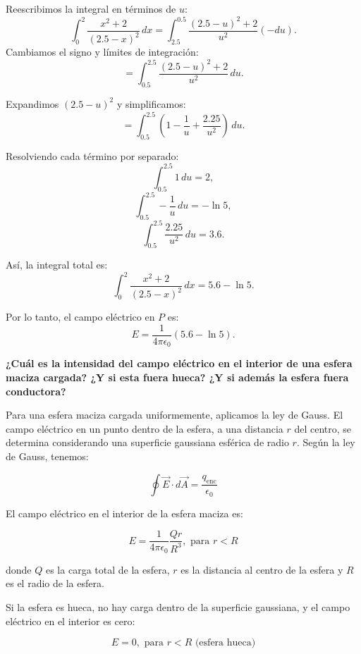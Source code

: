 \documentclass[12pt, answers]{exam} %
\begin{document}
\begin{questions}
    Reescribimos la integral en términos de \(u\):
    \[
    \int_0^2 \frac{x^2 + 2}{(2.5 - x)^2} \, dx = \int_{2.5}^{0.5} \frac{(2.5 - u)^2 + 2}{u^2} (-du).
    \]
    Cambiamos el signo y límites de integración:
    \[
    = \int_{0.5}^{2.5} \frac{(2.5 - u)^2 + 2}{u^2} \, du.
    \]
    
    Expandimos \((2.5 - u)^2\) y simplificamos:
    \[
    = \int_{0.5}^{2.5} \left( 1 - \frac{1}{u} + \frac{2.25}{u^2} \right) \, du.
    \]
    
    Resolviendo cada término por separado:
    \[
    \int_{0.5}^{2.5} 1 \, du = 2,
    \]
    \[
    \int_{0.5}^{2.5} -\frac{1}{u} \, du = -\ln 5,
    \]
    \[
    \int_{0.5}^{2.5} \frac{2.25}{u^2} \, du = 3.6.
    \]
    
    Así, la integral total es:
    \[
    \int_0^2 \frac{x^2 + 2}{(2.5 - x)^2} \, dx = 5.6 - \ln 5.
    \]
    

    
    Por lo tanto, el campo eléctrico en \(P\) es:
    \[
    E = \frac{1}{4 \pi \epsilon_0} \left( 5.6 - \ln 5 \right).
    \]

    \question \large\textbf{¿Cuál es la intensidad del campo eléctrico en el interior de una esfera maciza cargada? ¿Y si esta fuera hueca? ¿Y si además la esfera fuera conductora?}

    
        Para una esfera maciza cargada uniformemente, aplicamos la ley de Gauss. El campo eléctrico en un punto dentro de la esfera, a una distancia \( r \) del centro, se determina considerando una superficie gaussiana esférica de radio \( r \). Según la ley de Gauss, tenemos:
        
        \[
        \oint \vec{E} \cdot d\vec{A} = \frac{q_{\text{enc}}}{\epsilon_0}
        \]
        
        El campo eléctrico en el interior de la esfera maciza es:
        
        \[
        E = \frac{1}{4 \pi \epsilon_0} \frac{Q r}{R^3}, \text{ para } r < R
        \]
        
        donde \( Q \) es la carga total de la esfera, \( r \) es la distancia al centro de la esfera y \( R \) es el radio de la esfera.
        
        Si la esfera es hueca, no hay carga dentro de la superficie gaussiana, y el campo eléctrico en el interior es cero:
        
        \[
        E = 0, \text{ para } r < R \text{ (esfera hueca)}
        \]
        

\end{questions}
\end{document}

